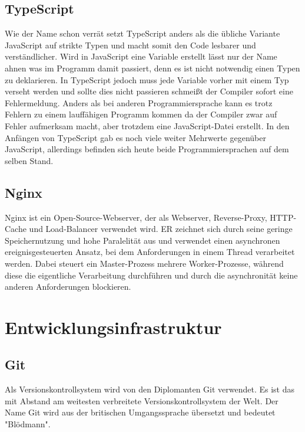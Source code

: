 \subsection{TypeScript}

Wie der Name schon verrät setzt TypeScript anders als die übliche Variante JavaScript auf strikte Typen und macht somit den Code lesbarer und verständlicher.
Wird in JavaScript eine Variable erstellt lässt nur der Name ahnen was im Programm damit passiert, denn es ist nicht notwendig einen Typen zu deklarieren.
In TypeScript jedoch muss jede Variable vorher mit einem Typ verseht werden und sollte dies nicht passieren schmeißt der Compiler sofort eine Fehlermeldung.
Anders als bei anderen Programmiersprache kann es trotz Fehlern zu einem lauffähigen Programm kommen da der Compiler zwar auf Fehler aufmerksam macht, aber
trotzdem eine JavaScript-Datei erstellt. In den Anfängen von TypeScript gab es noch viele weiter Mehrwerte gegenüber JavaScript, allerdings befinden sich heute
beide Programmiersprachen auf dem selben Stand.
\cite{sysarch-typeScript-1}

\subsection{Nginx}

Nginx ist ein Open-Source-Webserver, der als Webserver, Reverse-Proxy, HTTP-Cache und Load-Balancer verwendet wird.
ER zeichnet sich durch seine geringe Speichernutzung und hohe Paralelität aus und verwendet einen asynchronen ereignisgesteuerten
Ansatz, bei dem Anforderungen in einem Thread verarbeitet werden.
Dabei steuert ein Master-Prozess mehrere Worker-Prozesse, während diese die eigentliche Verarbeitung durchführen und durch die asynchronität keine anderen Anforderungen blockieren. 
\cite{sysarch-nginx-1}

\section{Entwicklungsinfrastruktur}

\subsection{Git}

Als Versionskontrollsystem wird von den Diplomanten Git verwendet.
Es ist das mit Abstand am weitesten verbreitete Versionskontrollsystem der Welt. Der Name Git wird aus der britischen 
Umgangssprache übersetzt und bedeutet "Blödmann".
\cite{sysarch-git-1}

